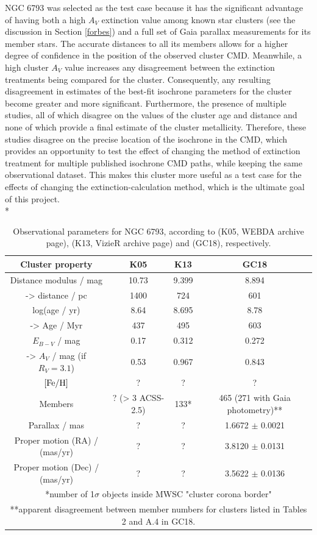 \documentclass[12pt, a4paper]{report}
\begin{document}
NGC 6793 was selected as the test case because it has the significant advantage of having both a high $A_{V}$ extinction value among known star clusters (see the discussion in Section \ref{forbes}) and a full set of Gaia parallax measurements for its member stars. The accurate distances to all its members allows for a higher degree of confidence in the position of the observed cluster CMD. Meanwhile, a high cluster $A_{V}$ value increases any disagreement between the extinction treatments being compared for the cluster. Consequently, any resulting disagreement in estimates of the best-fit isochrone parameters for the cluster become greater and more significant. Furthermore, the presence of multiple studies, all of which disagree on the values of the cluster age and distance and none of which provide a final estimate of the cluster metallicity. Therefore, these studies disagree on the precise location of the isochrone in the CMD, which provides an opportunity to test the effect of changing the method of extinction treatment for multiple published isochrone CMD paths, while keeping the same observational dataset. This makes this cluster more useful as a test case for the effects of changing the extinction-calculation method, which is the ultimate goal of this project.  \\*

\begin{table}
\begin{center}
\begin{tabular}{cccc}
\hline
Cluster property & K05 & K13 & GC18 \\
\hline
Distance modulus / mag & 10.73 & 9.399 & 8.894 \\
-> distance / pc & 1400 & 724 & 601 \\
log(age / yr) & 8.64 & 8.695 & 8.78 \\
-> Age / Myr & 437 & 495 & 603 \\
$E_{B-V}$ / mag & 0.17 & 0.312 & 0.272 \\
-> $A_{V}$ / mag (if $R_{V} = 3.1$) & 0.53 & 0.967 & 0.843 \\
$\textnormal{[Fe/H]}$ & ? & ? & ? \\
Members & ? (> 3 ACSS-2.5) & 133* & 465 (271 with Gaia photometry)** \\
Parallax / mas & ? & ? & 1.6672 $\pm$ 0.0021 \\
Proper motion (RA) / (mas/yr) & ? & ? & 3.8120 $\pm$ 0.0131 \\
Proper motion (Dec) / (mas/yr) & ? & ? & 3.5622 $\pm$ 0.0136 \\
\hline
\multicolumn{4}{c}{*number of 1$\sigma$ objects inside MWSC "cluster corona border"} \\
\multicolumn{4}{c}{**apparent disagreement between member numbers for clusters listed in Tables 2 and A.4 in GC18.} \\
\end{tabular}
\caption{Observational parameters for NGC 6793, according to \cite{2005A&A...438.1163K} (K05, WEBDA archive page), \cite{2013A&A...558A..53K} (K13, VizieR archive page) and \cite{2018A&A...616A..10G} (GC18), respectively.}
\label{NGC6793_obs}
\end{center}
\end{table}
\end{document}
